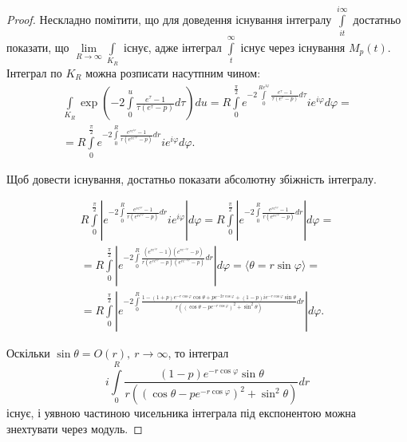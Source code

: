 \begin{lem}
\begin{proof}
Нескладно помітити, що для доведення існування інтегралу $\int\limits_{it}^{i\infty}$ достатньо показати, що $\lim\limits_{R \rightarrow \infty} \int\limits_{K_{R}}$ існує, адже інтеграл $\int\limits_{t}^{\infty}$ існує через існування $M_{p}(t)$. Інтеграл по $K_{R}$ можна розписати насутпним чином:
\begin{gather*}
\int\limits_{K_{R}} \exp\left(-2 \int\limits_{0}^{u} \frac{e^\tau -1}{\tau(e^\tau - p)} d\tau\right) du = 
R \int\limits_{0}^{\frac{\pi}{2}} e^{-2 \int\limits_{0}^{Re^{i\varphi}} \frac{e^\tau -1}{\tau(e^\tau - p)} d\tau} i e^{i\varphi}  d\varphi =\\
= R \int\limits_{0}^{\frac{\pi}{2}} e^{-2 \int\limits_{0}^{R} \frac{e^{re^{i\varphi}} -1}{r(e^{re^{i\varphi}} - p)} dr} i e^{i\varphi}  d\varphi.
\end{gather*}

Щоб довести існування, достатньо показати абсолютну збіжність інтегралу.

\begin{gather*}
R \int\limits_{0}^{\frac{\pi}{2}} \left| e^{-2 \int\limits_{0}^{R} \frac{e^{re^{i\varphi}} -1}{r(e^{re^{i\varphi}} - p)} dr} i e^{i\varphi} \right| d\varphi = R \int\limits_{0}^{\frac{\pi}{2}} \left| e^{-2 \int\limits_{0}^{R} \frac{e^{re^{i\varphi}} -1}{r(e^{re^{i\varphi}} - p)} dr} \right| d\varphi=\\
=R \int\limits_{0}^{\frac{\pi}{2}} \left| e^{-2 \int\limits_{0}^{R} \frac{(e^{re^{i\varphi}} -1)(e^{re^{-i\varphi}} - p)}{r(e^{re^{i\varphi}} - p)(e^{re^{-i\varphi}} - p)} dr} \right| d\varphi = \langle \theta = r \sin \varphi \rangle = \\
=R \int\limits_{0}^{\frac{\pi}{2}} \left| e^{-2 \int\limits_{0}^{R} \frac{1- (1+p)e^{-r \cos \varphi} \cos \theta + p e^{-2r \cos \varphi} + (1-p)ie^{-r \cos \varphi} \sin \theta}{r((\cos \theta - pe^{-r\cos \varphi})^{2} + \sin^2 \theta)} dr} \right| d\varphi.
\end{gather*}

Оскільки $\sin \theta = O(r), ~ r \rightarrow \infty$, то інтеграл
\begin{equation*}
i\int\limits_{0}^{R} \frac{(1-p)e^{-r \cos \varphi} \sin \theta}{r((\cos \theta - pe^{-r\cos \varphi})^{2} + \sin^2 \theta)} dr
\end{equation*}
існує, і уявною частиною чисельника інтеграла під експонентою можна знехтувати через модуль.


\end{proof}
\end{lem}
